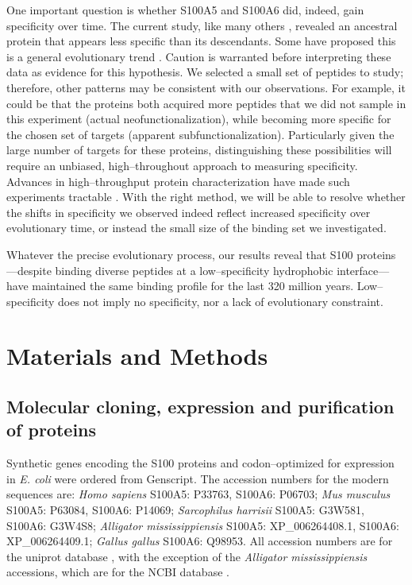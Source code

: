 One important question is whether S100A5 and S100A6 did, indeed, gain
specificity over time. The current study, like many others \citep{zou_evolution_2015,carroll_evolution_2008,devamani_catalytic_2016,khersonsky_enzyme_2010,voordeckers_how_2015,eick_evolution_2012,risso_thermostable_2014},
revealed an ancestral protein that appears less specific than its
descendants. Some have proposed this is a general evolutionary trend
\citep{zou_evolution_2015,khersonsky_enzyme_2010,risso_thermostable_2014}.
Caution is warranted before interpreting these data as evidence for
this hypothesis. We selected a small set of peptides to study; therefore,
other patterns may be consistent with our observations. For example,
it could be that the proteins both acquired more peptides that we
did not sample in this experiment (actual neofunctionalization), while
becoming more specific for the chosen set of targets (apparent subfunctionalization).
Particularly given the large number of targets for these proteins,
distinguishing these possibilities will require an unbiased, high--throughout
approach to measuring specificity. Advances in high--throughput protein
characterization have made such experiments tractable \citep{carlson_specificity_2010,fowler_high-resolution_2010,ernst_coevolution_2010,teyra_elucidation_2012,slattery_cofactor_2011}.
With the right method, we will be able to resolve whether the shifts
in specificity we observed indeed reflect increased specificity over
evolutionary time, or instead the small size of the binding set we
investigated. 

Whatever the precise evolutionary process, our results reveal that
S100 proteins---despite binding diverse peptides at a low--specificity
hydrophobic interface---have maintained the same binding profile for
the last 320 million years. Low--specificity does not imply no specificity,
nor a lack of evolutionary constraint. 

\section{Materials and Methods}

\subsection{Molecular cloning, expression and purification of proteins}

Synthetic genes encoding the S100 proteins and codon--optimized for
expression in \textit{E. coli} were ordered from Genscript. The accession
numbers for the modern sequences are: \textit{Homo sapiens }S100A5:
P33763, S100A6: P06703; \textit{Mus musculus }S100A5: P63084, S100A6:
P14069;\textit{ Sarcophilus harrisii} S100A5: G3W581, S100A6: G3W4S8;\textit{
Alligator mississippiensis} S100A5: XP\_006264408.1, S100A6: XP\_006264409.1;
\textit{Gallus gallus }S100A6: Q98953. All accession numbers are for
the uniprot database \citep{noauthor_uniprot:_2015}, with the exception
of the \textit{Alligator mississippiensis }accessions, which are for
the NCBI database \citep{maglott_entrez_2005}. 

